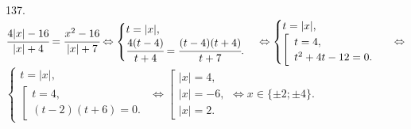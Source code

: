 137. $\cfrac{4|x|-16}{|x|+4}=\cfrac{x^2-16}{|x|+7}\Leftrightarrow \begin{cases} t=|x|,\\ \cfrac{4(t-4)}{t+4}=\cfrac{(t-4)(t+4)}{t+7}. \end{cases}\Leftrightarrow
\begin{cases} t=|x|,\\ \left[\begin{array}{l} t=4,\\ t^2+4t-12=0.\end{array}\right. \end{cases}\Leftrightarrow$\\$
\begin{cases} t=|x|,\\ \left[\begin{array}{l} t=4,\\ (t-2)(t+6)=0.\end{array}\right. \end{cases}\Leftrightarrow
\left[\begin{array}{l} |x|=4,\\ |x|=-6,\\ |x|=2.\end{array}\right.\Leftrightarrow x\in\{\pm 2; \pm4\}.$\\
